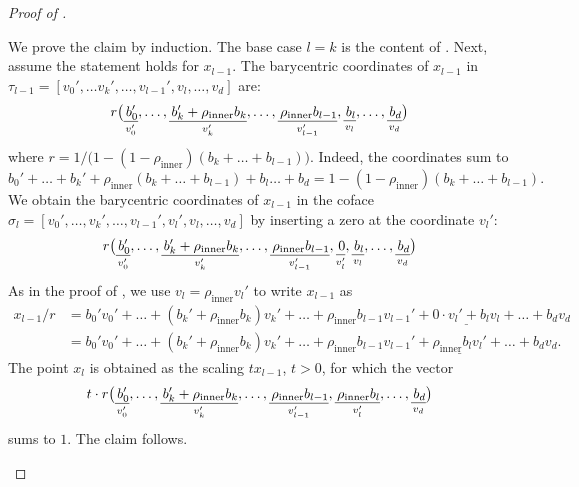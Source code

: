 \documentclass[a4paper,english,cleveref,autoref,thm-restate,nolineno]{socg-lipics-v2021}
\begin{document}
\begin{proof}[Proof of ]
	\begin{claimproof}
		We prove the claim by induction.
		The base case $l=k$ is the content of .
		Next, assume the statement holds for $x_{l-1}$.
		The barycentric coordinates of $x_{l-1}$ in $\tau_{l-1}=[v_0',\dots v_k',\dots,v_{l-1}',v_{l},\dots,v_d]$ are:
		\[
		r\big(
		\underset{ v_0'}{\underline{\vphantom{\rho_{\mathrm{inner}} b_k}\,
				b_0'}},
		\dots,
		\underset{ v_k'}{\underline{\vphantom{\rho_{\mathrm{inner}} b_k}\,
				b_k' + \rho_{\mathrm{inner}} b_k}},
		\dots,
		\underset{ v_{l-1}'}{\underline{\vphantom{\rho_{\mathrm{inner}} b_k}\,
				\rho_{\mathrm{inner}} b_{l-1}}},
		\underset{ v_l}{\underline{\vphantom{\rho_{\mathrm{inner}} b_k}\,
				b_l}},
		\dots,
		\underset{ v_d}{\underline{\vphantom{\rho_{\mathrm{inner}} b_k}\,
				b_d}}
		\big)
		\]
		where $r =1 /\big(1-(1 - \rho_{\mathrm{inner}})(b_k+\dots+b_{l-1})\big)$.
		Indeed, the coordinates sum to
		\[
		b_0'+\dots+b_k'+\rho_{\mathrm{inner}}(b_k+\dots+b_{l-1})+b_l\dots+b_d = 1-(1 - \rho_{\mathrm{inner}})(b_k+\dots+b_{l-1}).
		\]
		We obtain the barycentric coordinates of $x_{l-1}$ in the coface $\sigma_l = [v_0',\dots,v_k',\dots,v_{l-1}',v_l',v_l,\dots,v_d]$ by inserting a zero at the coordinate $v_l'$:
		\[
		r\big(
		\underset{ v_0'}{\underline{\vphantom{\rho_{\mathrm{inner}} b_k}\,
				b_0'}},
		\dots,
		\underset{ v_k'}{\underline{\vphantom{\rho_{\mathrm{inner}} b_k}\,
				b_k' + \rho_{\mathrm{inner}} b_k}},
		\dots,
		\underset{ v_{l-1}'}{\underline{\vphantom{\rho_{\mathrm{inner}} b_k}\,
				\rho_{\mathrm{inner}} b_{l-1}}},
		\underset{ v_l'}{\underline{\vphantom{\rho_{\mathrm{inner}} b_k}\,
		 		0}},
		\underset{ v_l}{\underline{\vphantom{\rho_{\mathrm{inner}} b_k}\,
				b_l}},
		\dots,
		\underset{ v_d}{\underline{\vphantom{\rho_{\mathrm{inner}} b_k}\,
				b_d}}
		\big)
		\]
		As in the proof of , we use $v_{l} = \rho_{\mathrm{inner}}v_l'$ to write $x_{l-1}$ as		
		\begin{align*}
			x_{l-1}/r &= 
				b_0'v_0'
				+\dots
				+(b_k'+\rho_{\mathrm{inner}}b_k)v_k'
				+\dots
				+\rho_{\mathrm{inner}}b_{l-1}v_{l-1}'
				+\underline{0\cdot v_l'+b_l v_l}
				+\dots
				+b_d v_d\\
					&= 
				b_0'v_0'
				+\dots
				+(b_k'+\rho_{\mathrm{inner}}b_k)v_k'
				+\dots
				+\rho_{\mathrm{inner}}b_{l-1}v_{l-1}'
				+\underline{ \rho_{\mathrm{inner}} b_l v_l'}
				+\dots
				+b_d v_d.
		\end{align*}
		The point $x_{l}$ is obtained as the scaling $tx_{l-1}$, $t>0$, for which the vector 
		\[
		t\cdot r\big(
		\underset{ v_0'}{\underline{\vphantom{\rho_{\mathrm{inner}} b_k}\,
				b_0'}},
		\dots,
		\underset{ v_k'}{\underline{\vphantom{\rho_{\mathrm{inner}} b_k}\,
				b_k' + \rho_{\mathrm{inner}} b_k}},
		\dots,
		\underset{ v_{l-1}'}{\underline{\vphantom{\rho_{\mathrm{inner}} b_k}\,
				\rho_{\mathrm{inner}} b_{l-1}}},
		\underset{ v_l'}{\underline{\vphantom{\rho_{\mathrm{inner}} b_k}\,
				\rho_{\mathrm{inner}}b_l}},
		\dots,
		\underset{ v_d}{\underline{\vphantom{\rho_{\mathrm{inner}} b_k}\,
				b_d}}
		\big)
		\]
		sums to $1$. 
		The claim follows.
	\end{claimproof}
	

\end{proof}
\end{document}
